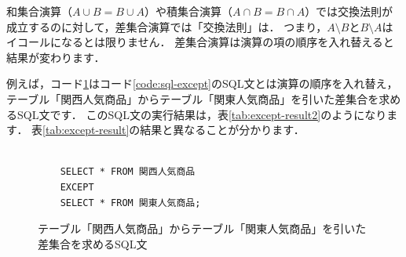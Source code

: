和集合演算（$A \cup B = B \cup A$）や積集合演算（$A \cap B = B \cap A$）では交換法則が成立するのに対して，差集合演算では「交換法則」は．
つまり，$A \setminus B$と$B \setminus A$はイコールになるとは限りません．
差集合演算は演算の項の順序を入れ替えると結果が変わります．

例えば，コード\ref{code:sql-except2}はコード\ref{code:sql-except}のSQL文とは演算の順序を入れ替え，テーブル「関西人気商品」からテーブル「関東人気商品」を引いた差集合を求めるSQL文です．
このSQL文の実行結果は，表\ref{tab:except-result2}のようになります．
表\ref{tab:except-result}の結果と異なることが分かります．
\begin{figure}[!htbp]
    \begin{verbatim}

    SELECT * FROM 関西人気商品
    EXCEPT
    SELECT * FROM 関東人気商品;

    \end{verbatim}
    \captionsetup{name=コード}
    \caption{テーブル「関西人気商品」からテーブル「関東人気商品」を引いた差集合を求めるSQL文}
    \label{code:sql-except2}
\end{figure}
\begin{table}[!htbp]
    \centering
    \caption{テーブル「関西人気商品」からテーブル「関東人気商品」を引いた差集合を求めるSQL文の実行結果}
    \label{tab:except-result2}
\end{table}

